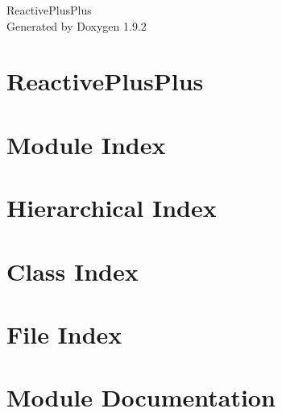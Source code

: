 \documentclass[twoside]{book}
\newcommand{\+}{\discretionary{\mbox{\scriptsize$\hookleftarrow$}}{}{}}
\newcommand{\clearemptydoublepage}{%
    \newpage{\pagestyle{empty}\cleardoublepage}%
  }
\begin{document}
  \raggedbottom
    \hypersetup{pageanchor=false,
                bookmarksnumbered=true,
                pdfencoding=unicode
               }
  \begin{titlepage}
  \vspace*{7cm}
  \begin{center}%
  {\Large Reactive\+Plus\+Plus}\\
  \vspace*{1cm}
  {\large Generated by Doxygen 1.9.2}\\
  \end{center}
  \end{titlepage}
  \clearemptydoublepage
  \tableofcontents
  \clearemptydoublepage
  \hypersetup{pageanchor=true}
\chapter{Reactive\+Plus\+Plus}
\label{index}\hypertarget{index}{}
\chapter{Module Index}

\chapter{Hierarchical Index}

\chapter{Class Index}

\chapter{File Index}

\chapter{Module Documentation}



\end{document}
